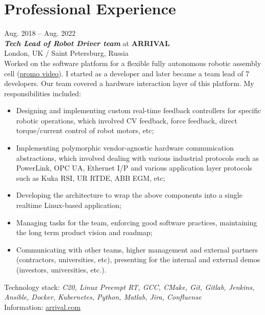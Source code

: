 \documentclass[a4paper,10pt]{article}
\def\CC{{C\nolinebreak[4]\hspace{-.05em}\raisebox{.4ex}{\tiny\bf ++}}}
\begin{document}
\hfill
%
\begin{adjustbox}{valign=t}
\begin{minipage}{0.61\textwidth} %

\section*{Professional Experience}
\raggedright
\textcolor{ColorOne}{Aug. 2018 -- Aug. 2022}\\
\emph{\textbf{Tech Lead of Robot Driver team}} at \textbf{ARRIVAL}\\
London, UK / Saint Petersburg, Russia\\
\vspace{10 pt}
Worked on the software platform for a flexible fully autonomous robotic assembly cell 
(\href{https://www.youtube.com/watch?v=fZ6QwM2CYK8}{\underline{promo video}}).
I started as a developer and later became a team lead of 7 developers. Our team covered a hardware interaction layer 
of this platform. My responsibilities included:
\begin{itemize}[noitemsep]
	\item Designing and implementing custom real-time feedback controllers for specific robotic operations, which 
		involved CV feedback, force feedback, direct torque/current control of robot motors, etc;
	\item Implementing polymorphic vendor-agnostic hardware communication abstractions, which involved dealing with
		various industrial protocols such as PowerLink, OPC UA, Ethernet I/P and various application layer 
		protocols such as Kuka RSI, UR RTDE, ABB EGM, etc;
	\item Developing the architecture to wrap the above components into a single realtime Linux-based application;
	\item Managing tasks for the team, enforcing good software practices, maintaining the long term product vision
		and roadmap;
	\item Communicating with other teams, higher management and external partners (contractors, universities, etc),
		presenting for the internal and external demos (investors, universities, etc.).
\end{itemize}
Technology stack: 
\emph{\CC 20, Linux Preempt RT, GCC, CMake, Git, Gitlab, Jenkins, Ansible, Docker, Kubernetes, Python, Matlab, Jira, Confluense}\\
Information: \href{https://arrival.com}{\underline{arrival.com}}
\vspace{10 pt}
	

\end{minipage}
\end{adjustbox}
\end{document}
